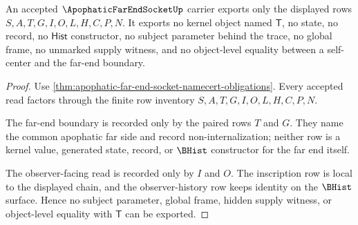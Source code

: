 \begin{theorem}
\label{thm:apophatic-far-end-socket-nonescape}
An accepted $\ApophaticFarEndSocketUp$ carrier exports only the displayed rows $S,A,T,G,I,O,L,H,C,P,N$. It exports no kernel object named $\mathsf{T}$, no state, no record, no $\mathsf{Hist}$ constructor, no subject parameter behind the trace, no global frame, no unmarked supply witness, and no object-level equality between a self-center and the far-end boundary.
\end{theorem}
\begin{proof}
Use \autoref{thm:apophatic-far-end-socket-namecert-obligations}. Every accepted read factors through the finite row inventory $S,A,T,G,I,O,L,H,C,P,N$.

The far-end boundary is recorded only by the paired rows $T$ and $G$. They name the common apophatic far side and record non-internalization; neither row is a kernel value, generated state, record, or $\BHist$ constructor for the far end itself.

The observer-facing read is recorded only by $I$ and $O$. The inscription row is local to the displayed chain, and the observer-history row keeps identity on the $\BHist$ surface. Hence no subject parameter, global frame, hidden supply witness, or object-level equality with $\mathsf{T}$ can be exported.
\end{proof}

